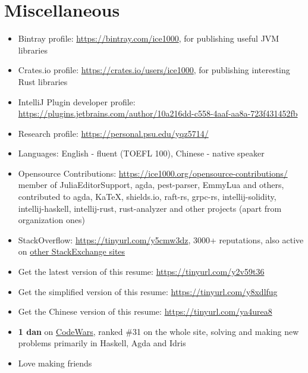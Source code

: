 \documentclass{resume}
\begin{document}
\section{Miscellaneous}
\begin{itemize}
  \item Bintray profile: \url{https://bintray.com/ice1000}, for publishing useful JVM libraries
  \item Crates.io profile: \url{https://crates.io/users/ice1000}, for publishing interesting Rust libraries
  \item IntelliJ Plugin developer profile:
    \url{https://plugins.jetbrains.com/author/10a216dd-c558-4aaf-aa8a-723f431452fb}
  \item Research profile: \url{https://personal.psu.edu/yqz5714/}
  \item Languages: English - fluent (TOEFL 100), Chinese - native speaker
  \item Opensource Contributions: \url{https://ice1000.org/opensource-contributions/} \\
    member of \textsf{JuliaEditorSupport}, \textsf{agda}, \textsf{pest-parser}, \textsf{EmmyLua} and others,
    contributed to \textsf{agda, KaTeX, shields.io, raft-rs, grpc-rs, intellij-solidity, intellij-haskell,
    intellij-rust, rust-analyzer}
    and other projects
    (apart from organization ones)
  \item StackOverflow: \url{https://tinyurl.com/y5cmw3dz},
    3000+ reputations, also active on \href{https://stackexchange.com/users/9532102/} {other StackExchange sites}
  \item Get the latest version of this resume: \url{https://tinyurl.com/y2v59t36}
  \item Get the simplified version of this resume: \url{https://tinyurl.com/y8xdlfug}
  \item Get the Chinese version of this resume: \url{https://tinyurl.com/ya4urea8}
  \item \textbf{1 dan} on
    \href{https://www.codewars.com/users/ice1000} {CodeWars},
    ranked \#31 on the whole site,
    solving and making new problems primarily in Haskell, Agda and Idris
  \item Love making friends
\end{itemize}

%
%
\end{document}
